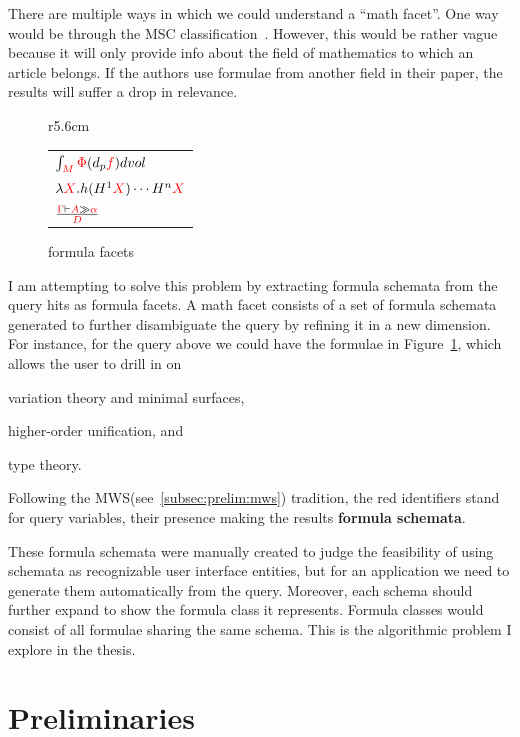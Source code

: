 \documentclass[a4paper,oneside]{article}
\def\red#1{\textcolor{red}{#1}}
\def\MWS{\textsf{MWS}\xspace}
\begin{document}
There are multiple ways in which we could understand a ``math facet''.  One way
would be through the MSC classification~\cite{MSC-SKOS}.  However, this would
be rather vague because it will only provide info about the field of
mathematics to which an article belongs. If the authors use formulae from
another field in their paper, the results will suffer a drop in relevance.

\begin{figure}r{5.6cm}\vspace*{-1em}
\begin{tabular}{l}
$\int_{\red{M}}{\red\Phi(d_p\red{f}) dvol}$\\[1ex]
$\lambda{\red{X}}.h(H^1\red{X})\cdots{H^n\red{X}}$\\[1ex]
$\frac{\red\Gamma\vdash\red{A}\gg\red\alpha}{\red{D}}$
\end{tabular}\vspace*{-.5em}
\caption{formula facets}\label{fig:formula-facets}\vspace*{-1em}
\end{figure}

I am attempting to solve this problem by extracting formula schemata from the
query hits as formula facets. A math facet consists of a set of formula
schemata generated to further disambiguate the query by refining it in a new
dimension.  For instance, for the query above we could have the formulae in
Figure~\ref{fig:formula-facets}, which allows the user to drill in on
\begin{inparaenum}[\em i\rm)]
\item variation theory and minimal surfaces,
\item higher-order unification, and
\item type theory.
\end{inparaenum}
Following the \MWS (see~\ref{subsec:prelim:mws}) tradition, the red identifiers
stand for query variables, their presence making the results \textbf{formula
schemata}.

These formula schemata were manually created to judge the feasibility of using
schemata as recognizable user interface entities, but for an application we
need to generate them automatically from the query. Moreover, each schema
should further expand to show the formula class it represents. Formula classes
would consist of all formulae sharing the same schema. This is the algorithmic
problem I explore in the thesis.


\section{Preliminaries}\label{sec:prelim}
\end{document}
